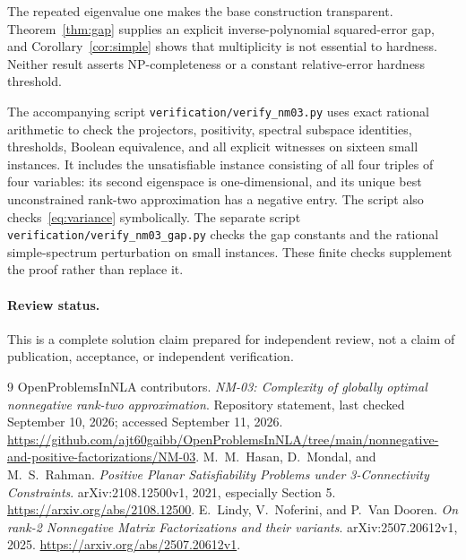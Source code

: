 \documentclass[11pt]{article}
\begin{document}
The repeated eigenvalue one makes the base construction transparent. Theorem~\ref{thm:gap} supplies an explicit inverse-polynomial squared-error gap, and Corollary~\ref{cor:simple} shows that multiplicity is not essential to hardness. Neither result asserts NP-completeness or a constant relative-error hardness threshold.

The accompanying script \texttt{verification/verify\_nm03.py} uses exact rational arithmetic to check the projectors, positivity, spectral subspace identities, thresholds, Boolean equivalence, and all explicit witnesses on sixteen small instances. It includes the unsatisfiable instance consisting of all four triples of four variables: its second eigenspace is one-dimensional, and its unique best unconstrained rank-two approximation has a negative entry. The script also checks~\eqref{eq:variance} symbolically. The separate script \texttt{verification/verify\_nm03\_gap.py} checks the gap constants and the rational simple-spectrum perturbation on small instances. These finite checks supplement the proof rather than replace it.

\paragraph{Review status.} This is a complete solution claim prepared for independent review, not a claim of publication, acceptance, or independent verification.

\begin{thebibliography}{9}
OpenProblemsInNLA contributors.
\emph{NM-03: Complexity of globally optimal nonnegative rank-two approximation}.
Repository statement, last checked September 10, 2026; accessed September 11, 2026.
\url{https://github.com/ajt60gaibb/OpenProblemsInNLA/tree/main/nonnegative-and-positive-factorizations/NM-03}.
M.~M.~Hasan, D.~Mondal, and M.~S.~Rahman.
\emph{Positive Planar Satisfiability Problems under 3-Connectivity Constraints}.
arXiv:2108.12500v1, 2021, especially Section 5.
\url{https://arxiv.org/abs/2108.12500}.
E.~Lindy, V.~Noferini, and P.~Van Dooren.
\emph{On rank-2 Nonnegative Matrix Factorizations and their variants}.
arXiv:2507.20612v1, 2025.
\url{https://arxiv.org/abs/2507.20612v1}.
\end{thebibliography}
\end{document}
